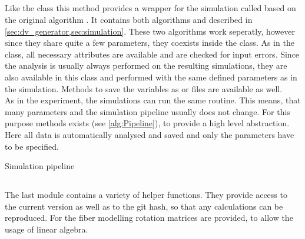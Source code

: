 \subsection{}
Like the  class this method provides a wrapper for the simulation called  based on the original algorithm \cite{Dohmen2015,Lucksch2016}.
It contains both algorithms  and  described in \cref{sec:dv_generator,sec:simulation}.
These two algorithms work seperatly, however since they share quite a few parameters, they coexists inside the class.
As in the  class, all necessary attributes are available and are checked for input errors.
Since the analysis is usually always performed on the resulting simulations, they are also available in this class and performed with the same defined parameters as in the simulation.
Methods to save the variables as  or \hdf{} files are available as well.
\\
As in the experiment, the simulations can run the same routine.
This means, that many parameters and the simulation pipeline usually does not change.
For this purpose  methods exists (see \cref{alg:Pipeline}), to provide a high level abstraction.
Here all data is automatically analysed and saved and only the parameters have to be specified.
%
\begin{lstfloat}[!tb]
\centering
\scalebox{0.75}{
\begin{minipage}{\the\textwidth}

\end{minipage}}
\caption{Simulation pipeline}
\label{alg:Pipeline}
\end{lstfloat}
%
%
\subsection{}
The last module contains a variety of helper functions.
They provide access to the current version as well as to the git hash, so that any calculations can be reproduced.
For the fiber modelling rotation matrices are provided, to allow the usage of linear algebra.
%
%
%
